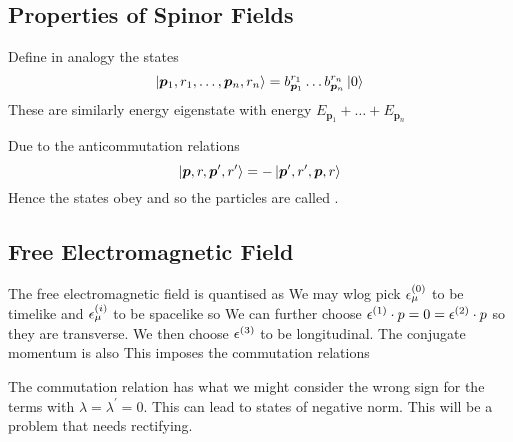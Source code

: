 \documentclass{article}
\begin{document}
\subsection{Properties of Spinor Fields}

\begin{definition}
Define in analogy the states 
\[
\ket{\bm{p}_1,r_1,\dots,\bm{p}_n,r_n} = b_{\bm{p}_1}^{r_1} \dots b_{\bm{p}_n}^{r_n} \ket{0}
\]
These are similarly energy eigenstate with energy $E_{\bm{p}_1}+\dots+E_{\bm{p}_n}$
\end{definition}

\begin{theorem}
Due to the anticommutation relations 
\[
\ket{\bm{p},r,\bm{p}^\prime,r^\prime}=-\ket{\bm{p}^\prime,r^\prime,\bm{p},r}
\]
Hence the states obey  and so the particles are called .  
\end{theorem}

\subsection{Free Electromagnetic Field}
The free electromagnetic field is quantised as 
We may wlog pick $\epsilon_\mu^{(0)}$ to be timelike and $\epsilon_\mu^{(i)}$ to be spacelike so 
\eq{
\eps^{(\lambda)} \cdot \eps^{(\lambda^\prime)} = \eta^{\lambda \lambda^\prime}
}
We can further choose $\epsilon^{(1)} \cdot p = 0 = \epsilon^{(2)} \cdot p$ so they are transverse. We then choose $\epsilon^{(3)}$ to be longitudinal. The conjugate momentum is also 
This imposes the commutation relations 

\begin{remark}
The commutation relation has what we might consider the wrong sign for the terms with $\lambda = \lambda^\prime = 0$. This can lead to states of negative norm. This will be a problem that needs rectifying. 
\end{remark}
\end{document}
